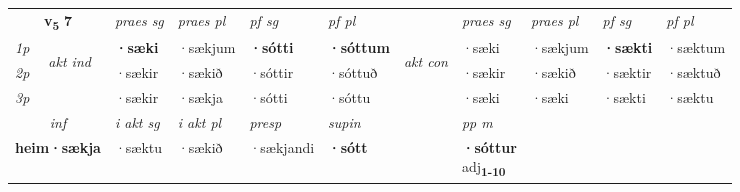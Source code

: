 \noindent
\begin{tabular}{lllllllllll} \toprule
\multicolumn{2}{c}{\textbf{v{\textsubscript{5}}} \Large{\textbf{7}}}  &  \textit{praes sg}  & \textit{praes pl}  &\textit{ pf sg} & \textit{pf pl} &  &  \textit{praes sg}  & \textit{praes pl}  & \textit{pf sg} & \textit{pf pl } \\*
	\cmidrule{3-6} \cmidrule{8-11}
 {\textit{1p}} & \multirow{3}{*}{\begin{turn}{90}\textit{akt ind}\end{turn}} & \textbf{·sæki} & ·sækjum & \textbf{·sótti} & \textbf{·sóttum} & \multirow{3}{*}{\begin{turn}{90}\textit{akt con}\end{turn}} &·sæki & ·sækjum & \textbf{·sækti} & ·sæktum\\*
 {\textit{2p}} &  &  ·sækir  & ·sækið & ·sóttir & ·sóttuð & & ·sækir & ·sækið & ·sæktir & ·sæktuð \\*
{\textit{3p}} &  & ·sækir & ·sækja & ·sótti & ·sóttu & & ·sæki & ·sæki& ·sækti & ·sæktu \\*
\cmidrule{3-6} \cmidrule{8-11}

   \multicolumn{2}{c}{\textit{inf}}  & \textit{i akt sg} & \textit{i akt pl}   & \textit{presp} & \textit{supin}  && \textit{pp m} \\*
  \multicolumn{2}{c}{\textbf{heim\allowbreak ·sækja}} & ·sæktu  & ·sækið   & ·sækjandi &  \textbf{·sótt}  && \specialcell{\textbf{·sóttur} \\ adj\textbf{\textsubscript{1-10}}} \\*
\end{tabular}

